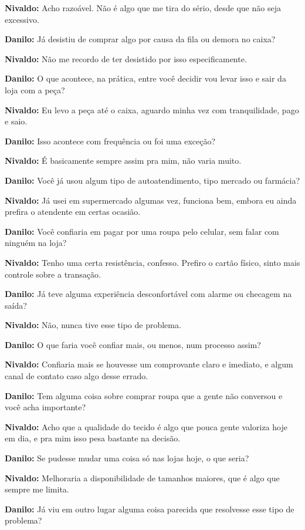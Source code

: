 \textbf{Nivaldo:} Acho razoável. Não é algo que me tira do sério, desde que não seja excessivo.

\textbf{Danilo:} Já desistiu de comprar algo por causa da fila ou demora no caixa?

\textbf{Nivaldo:} Não me recordo de ter desistido por isso especificamente.

\textbf{Danilo:} O que acontece, na prática, entre você decidir vou levar isso e sair da loja com a peça?

\textbf{Nivaldo:} Eu levo a peça até o caixa, aguardo minha vez com tranquilidade, pago e saio.

\textbf{Danilo:} Isso acontece com frequência ou foi uma exceção?

\textbf{Nivaldo:} É basicamente sempre assim pra mim, não varia muito.

\textbf{Danilo:} Você já usou algum tipo de autoatendimento, tipo mercado ou farmácia?

\textbf{Nivaldo:} Já usei em supermercado algumas vez, funciona bem, embora eu ainda prefira o atendente em certas ocasião.

\textbf{Danilo:} Você confiaria em pagar por uma roupa pelo celular, sem falar com ninguém na loja?

\textbf{Nivaldo:} Tenho uma certa resistência, confesso. Prefiro o cartão físico, sinto mais controle sobre a transação.

\textbf{Danilo:} Já teve alguma experiência desconfortável com alarme ou checagem na saída?

\textbf{Nivaldo:} Não, nunca tive esse tipo de problema.

\textbf{Danilo:} O que faria você confiar mais, ou menos, num processo assim?

\textbf{Nivaldo:} Confiaria mais se houvesse um comprovante claro e imediato, e algum canal de contato caso algo desse errado.

\textbf{Danilo:} Tem alguma coisa sobre comprar roupa que a gente não conversou e você acha importante?

\textbf{Nivaldo:} Acho que a qualidade do tecido é algo que pouca gente valoriza hoje em dia, e pra mim isso pesa bastante na decisão.

\textbf{Danilo:} Se pudesse mudar uma coisa só nas lojas hoje, o que seria?

\textbf{Nivaldo:} Melhoraria a disponibilidade de tamanhos maiores, que é algo que sempre me limita.

\textbf{Danilo:} Já viu em outro lugar alguma coisa parecida que resolvesse esse tipo de problema?

